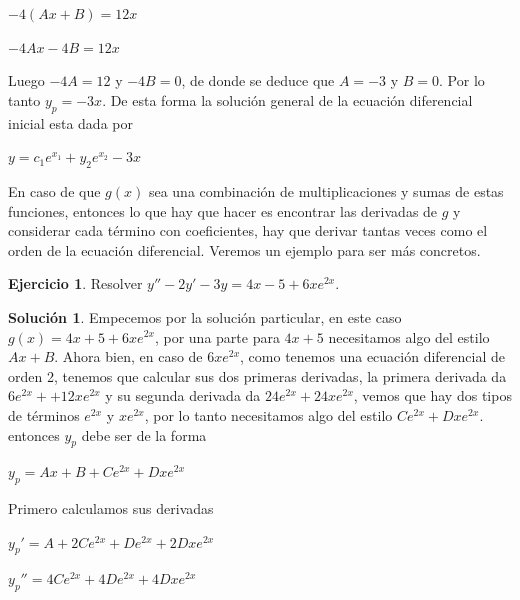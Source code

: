 \documentclass{article}
\theoremstyle{plain}
\theoremstyle{definition}
\newtheorem{ejer}[thm]{Ejercicio}
\newtheorem{sol}[thm]{Solución}
\begin{document}
\begin{center}
$-4(Ax+B)= 12x$
\end{center}

\begin{center}
$-4Ax-4B= 12x$
\end{center}


Luego $-4A=12$ y $-4B=0$, de donde se deduce que $A=-3$ y $B=0$. Por lo tanto $y_p=-3x$. De esta forma la solución general de la ecuación diferencial inicial esta dada por


\begin{center}
$y= c_1e^{x_1}+y_2e^{x_2} -3x$
\end{center}


En caso de que $g(x)$ sea una combinación de multiplicaciones y sumas de estas funciones, entonces lo que hay que hacer es encontrar las derivadas de $g$ y considerar cada término con coeficientes, hay que derivar tantas veces como el orden de la ecuación diferencial. Veremos un ejemplo para ser más concretos. \\




\begin{ejer}Resolver $y''-2y'-3y=4x-5+6xe^{2x}$. \\
\end{ejer}

\begin{sol}Empecemos por la solución particular, en este caso $g(x)= 4x+5+6xe^{2x}$, por una parte para $4x+5$ necesitamos algo del estilo $Ax+B$. Ahora bien, en caso de $6xe^{2x}$, como tenemos una ecuación diferencial de orden 2, tenemos que calcular sus dos primeras derivadas, la primera derivada da $6e^{2x}++12xe^{2x}$ y su segunda derivada da $24e^{2x} +24xe^{2x}$, vemos que hay dos tipos de términos $e^{2x}$ y $xe^{2x}$, por lo tanto necesitamos algo del estilo $Ce^{2x}+Dxe^{2x}$. entonces $y_p$ debe ser de la forma
\end{sol}

\begin{center}
$y_p= Ax+B+Ce^{2x}+Dxe^{2x}$
\end{center}

Primero calculamos sus derivadas

\begin{center}
$y_p'= A+2Ce^{2x}+De^{2x}+2Dxe^{2x}$
\end{center}



\begin{center}
$y_p''= 4Ce^{2x}+ 4De^{2x}+4Dxe^{2x}$
\end{center}
\end{document}
